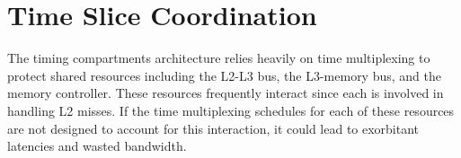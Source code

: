 % 
% 
% 
% 
% 

\section{Time Slice Coordination}
\label{sec:coordination}

The timing compartments architecture relies heavily on time multiplexing to 
protect shared resources including the L2-L3 bus, the L3-memory bus, and the 
memory controller. These resources frequently interact since each is involved 
in handling L2 misses. If the time multiplexing schedules for each of these 
resources are not designed to account for this interaction, it could lead to 
exorbitant latencies and wasted bandwidth.

